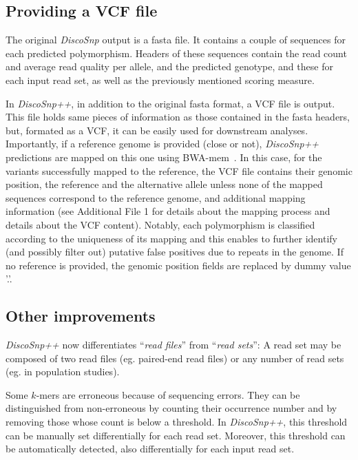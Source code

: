 \documentclass{bmcart}
\newcommand{\disco}{{\it DiscoSnp}\xspace}
\newcommand{\discopp}{{\it DiscoSnp++}\xspace}
\begin{document}
\subsection*{Providing a VCF file}
The original \disco output is a fasta file. It contains a couple of sequences for each predicted polymorphism. Headers of these sequences contain the read count and average read quality per allele, and the predicted genotype, and these for each input read set, as well as the previously mentioned scoring measure.  

In \discopp, in addition to the original fasta format, a VCF file is output. This file holds same pieces of information as those contained in the fasta headers, but, formated as a VCF, it can be easily used for downstream analyses. 
Importantly, if a reference genome is provided (close or not), \discopp predictions are mapped on this one using BWA-mem~\cite{bwa}. In this case, for the variants successfully mapped to the reference, the VCF file contains their genomic position, the reference and the alternative allele unless none of the mapped sequences correspond to the reference genome, and additional mapping information (see Additional File 1 for details about the mapping process and details about the VCF content). Notably, each polymorphism is classified according to the uniqueness of its mapping and this enables to further identify (and possibly filter out) putative false positives due to repeats in the genome.
If no reference is provided, the genomic position fields are replaced by dummy value '.'.

\subsection*{Other improvements}
\discopp now differentiates ``\emph{read files}'' from ``\emph{read sets}'': A read set may be composed of two read files (eg. paired-end read files) or any number of read sets (eg. in population studies). 

Some $k$-mers are erroneous because of sequencing errors. They can be distinguished from non-erroneous by counting their occurrence number and by removing those whose count is below a threshold. In \discopp, this threshold can be manually set differentially for each read set. Moreover, this threshold can be automatically detected, also differentially for each input read set. 
\end{document}
